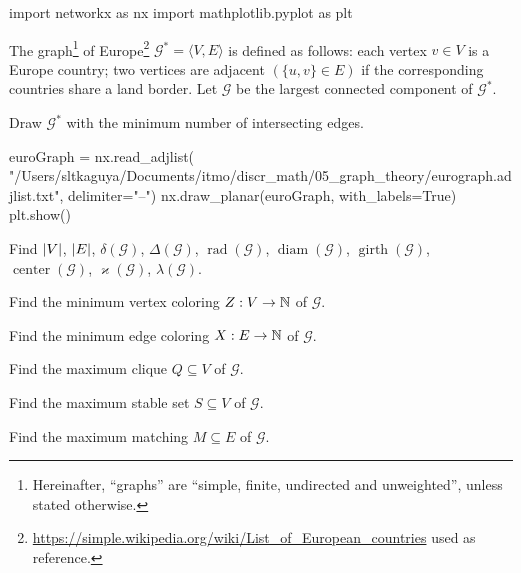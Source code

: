 \documentclass[a4paper,12pt]{article}
\newcommand{\graph}[1][G]{\mathcal{#1}}
\newcommand{\op}[1]{\operatorname*{#1}}
\newcommand{\minDegree}[1]{\delta(#1)}
\newcommand{\maxDegree}[1]{\Delta(#1)}
\newcommand{\graphRadius}[1]{\op{rad}(#1)}
\newcommand{\graphDiameter}[1]{\op{diam}(#1)}
\newcommand{\graphGirth}[1]{\op{girth}(#1)}
\newcommand{\graphCenter}[1]{\op{center}(#1)}
\newcommand{\vertexConnectivity}[1]{\varkappa(#1)}
\newcommand{\edgeConnectivity}[1]{\lambda(#1)}
\begin{document}
\begin{pycode}
    import networkx as nx
    import mathplotlib.pyplot as plt
\end{pycode}

\begin{tasks}
    \item The graph\footnote{Hereinafter, \enquote{graphs} are \enquote{simple, finite, undirected and unweighted}, unless stated otherwise.} of Europe\footnote{\url{https://simple.wikipedia.org/wiki/List_of_European_countries} used as reference.} $\graph^{*} = \langle V, E\rangle$ is defined as follows: each vertex $v \in V$ is a Europe country; two vertices are adjacent $(\{u, v\} \in E)$ if the corresponding countries share a land border. Let $\graph$ be the largest connected component of $\graph^{*}$.
    
    \begin{subtasks}
        \item Draw $\graph^{*}$ with the minimum number of intersecting edges.
        
        \begin{pycode}
            euroGraph = nx.read_adjlist(
                "/Users/sltkaguya/Documents/itmo/discr_math/05_graph_theory/eurograph.adjlist.txt", delimiter="--")
            nx.draw_planar(euroGraph, with_labels=True)
            plt.show()
        \end{pycode}
        
        \item Find $\left|V\right|$, $\left|E\right|$, $\minDegree{\graph}$, $\maxDegree{\graph}$, $\graphRadius{\graph}$, $\graphDiameter{\graph}$, $\graphGirth{\graph}$, $\graphCenter{\graph}$, $\vertexConnectivity{\graph}$, $\edgeConnectivity{\graph}$.

        \item Find the minimum vertex coloring $Z: V \to \mathbb{N}$ of $\graph$.
        
        \item Find the minimum edge coloring $X: E \to \mathbb{N}$ of $\graph$.
        
        \item Find the maximum clique $Q \subseteq V$ of $\graph$.

        \item Find the maximum stable set $S \subseteq V$ of $\graph$.
        
        \item Find the maximum matching $M \subseteq E$ of $\graph$.
        

\end{subtasks}
\end{tasks}
\end{document}
